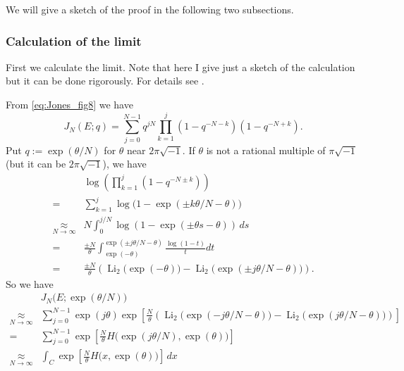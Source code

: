 \documentclass{amsart}
\newcommand{\Li}{\operatorname{Li}}
\theoremstyle{definition}
\theoremstyle{remark}
\numberwithin{equation}{section}
\begin{document}
We will give a sketch of the proof in the following two subsections.
\subsubsection{Calculation of the limit}
First we calculate the limit.
Note that here I give just a sketch of the calculation but it can be done rigorously.
For details see \cite{Murakami/Yokota:JREIA2007}.
\par
From \eqref{eq:Jones_fig8} we have
\begin{equation*}
  J_N(E;q)
  =
  \sum_{j=0}^{N-1}
  q^{jN}
  \prod_{k=1}^{j}
  \left(1-q^{-N-k}\right)
  \left(1-q^{-N+k}\right).
\end{equation*}
Put $q:=\exp(\theta/N)$ for $\theta$ near $2\pi\sqrt{-1}$.
If $\theta$ is not a rational multiple of $\pi\sqrt{-1}$ (but it can be $2\pi\sqrt{-1}$), we have
\begin{equation*}
\begin{split}
  &\log
  \left(
    \prod_{k=1}^{j}
    \left(1-q^{-N\pm k}\right)
  \right)
  \\
 =&
  \sum_{k=1}^{j}
  \log
  \big(1-\exp(\pm k\theta/N-\theta)\bigr)
  \\
  \underset{N\to\infty}{\approx}&
  N
  \int_{0}^{j/N}\log(1-\exp(\pm\theta s-\theta))\,ds
  \\
  =&
  \frac{\pm N}{\theta}
  \int_{\exp(-\theta)}^{\exp(\pm j\theta/N-\theta)}
  \frac{\log(1-t)}{t}dt
  \\
  =&
  \frac{\pm N}{\theta}
  \left(
    \Li_2\bigl(\exp(-\theta)\bigr)
    -
    \Li_2\bigl(\exp(\pm j\theta/N-\theta)\bigr)
  \right).
\end{split}
\end{equation*}
So we have
\begin{equation*}
\begin{split}
  &J_N\bigl(E;\exp(\theta/N)\bigr)
  \\
  \underset{N\to\infty}{\approx}&
  \sum_{j=0}^{N-1}
  \exp(j\theta)
  \exp
  \left[
    \frac{N}{\theta}
    \left(
      \Li_2\bigl(\exp(-j\theta/N-\theta)\bigr)
      -
      \Li_2\bigl(\exp(j\theta/N-\theta)\bigr)
    \right)
  \right]
  \\
  =&
  \sum_{j=0}^{N-1}
  \exp
  \left[
    \frac{N}{\theta}
    H\bigl(\exp(j\theta/N),\exp(\theta)\bigr)
  \right]
  \\
  \underset{N\to\infty}{\approx}&
  \int_{C}
  \exp
  \left[
    \frac{N}{\theta}
    H\bigl(x,\exp(\theta)\bigr)
  \right]
  \,dx
\end{split}
\end{equation*}
\end{document}
